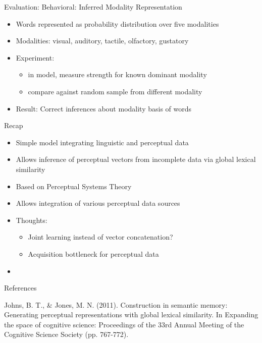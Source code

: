 \documentclass[12pt,a4paper]{beamer}
\begin{document}
\begin{frame}{Evaluation: Behavioral: Inferred Modality Representation}
\begin{itemize}
\item Words represented as probability distribution over five modalities
\item Modalities: visual, auditory, tactile, olfactory, gustatory
\item Experiment:
    \begin{itemize}
    \item in model, measure strength for known dominant modality
    \item compare against random sample from different modality
    \end{itemize}
\item Result: Correct inferences about modality basis of words
\end{itemize}
\end{frame}


\begin{frame}{Recap}
\begin{itemize}
\item Simple model integrating linguistic and perceptual data
\item Allows inference of perceptual vectors from incomplete data via global lexical similarity
\item Based on Perceptual Systems Theory
\item Allows integration of various perceptual data sources
\item Thoughts:
    \begin{itemize}
    \item Joint learning instead of vector concatenation?
    \item Acquisition bottleneck for perceptual data
    \end{itemize}

\end{itemize}
\end{frame}


\begin{frame}{}
\begin{itemize}
\item
\end{itemize}
\end{frame}


\begin{frame}{References}
\begin{thebibliography}{-}
 Johns, B. T., \& Jones, M. N. (2011). Construction in semantic memory: Generating perceptual representations with global lexical similarity. In Expanding the space of cognitive science: Proceedings of the 33rd Annual Meeting of the Cognitive Science Society (pp. 767-772).
\end{thebibliography}
\end{frame}
\end{document}
